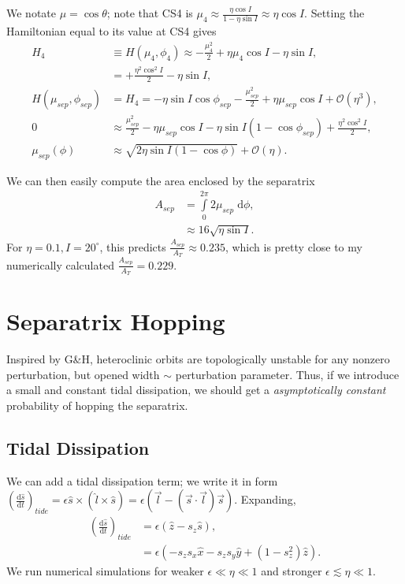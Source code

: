 \documentclass[11pt,
        usenames, %
        dvipsnames %
    ]{article}
\newcommand*{\rd}[2]{\frac{\mathrm{d}#1}{\mathrm{d}#2}}
\newcommand*{\p}[1]{\left(#1\right)}
\begin{document}
We notate $\mu = \cos\theta$; note that CS4 is $\mu_4 \approx \frac{\eta \cos
I}{1 - \eta \sin I} \approx \eta \cos I$. Setting the Hamiltonian equal to its
value at CS4 gives
\begin{align*}
    H_4 &\equiv H\p{\mu_4, \phi_4}
        \approx -\frac{\mu_4^2}{2} + \eta \mu_4 \cos I - \eta \sin I,\\
        &= +\frac{\eta^2\cos^2 I}{2} - \eta \sin I,\\
    H(\mu_{sep}, \phi_{sep})
        &= H_4 = -\eta \sin I \cos \phi_{sep} - \frac{\mu_{sep}^2}{2} + \eta
            \mu_{sep} \cos I + \mathcal{O}(\eta^3),\\
    0 &\approx \frac{\mu_{sep}^2}{2} - \eta \mu_{sep} \cos I
        - \eta \sin I\p{1 - \cos \phi_{sep}} + \frac{\eta^2\cos^2I}{2},\\
    \mu_{sep}\p{\phi} &\approx \sqrt{2\eta \sin I\p{1 - \cos \phi}}
        + \mathcal{O}(\eta).
\end{align*}

We can then easily compute the area enclosed by the separatrix
\begin{align}
    A_{sep} &= \int\limits_0^{2\pi}2\mu_{sep}\;\mathrm{d}\phi,\nonumber\\
        &\approx 16\sqrt{\eta \sin I}.
\end{align}
For $\eta = 0.1, I = 20^\circ$, this predicts $\frac{A_{sep}}{A_{T}} \approx
0.235$, which is pretty close to my numerically calculated $\frac{A_{sep}}{A_T}
= 0.229$.

\section{Separatrix Hopping}

Inspired by G\&H, heteroclinic orbits are topologically unstable for any nonzero
perturbation, but opened width $\sim$ perturbation parameter. Thus, if we
introduce a small and constant tidal dissipation, we should get a
\emph{asymptotically constant} probability of hopping the separatrix.

\subsection{Tidal Dissipation}

We can add a tidal dissipation term; we write it in form
$\p{\rd{\hat{s}}{t}}_{tide} = \epsilon \hat{s} \times \p{\hat{l} \times
\hat{s}} = \epsilon\p{\vec{l} - \p{\vec{s} \cdot \vec{l}}\vec{s}}$. Expanding,
\begin{align}
    \p{\rd{\hat{s}}{t}}_{tide} &= \epsilon \p{\hat{z} - s_z\hat{s}}
        ,\nonumber\\
        &= \epsilon \p{-s_z s_x\hat{x} - s_zs_y\hat{y} + \p{1 - s_z^2}
            \hat{z}}.\label{eq:p1_eom}
\end{align}
We run numerical simulations for weaker $\epsilon \ll \eta \ll 1$ and stronger
$\epsilon \lesssim \eta \ll 1$.
\end{document}
